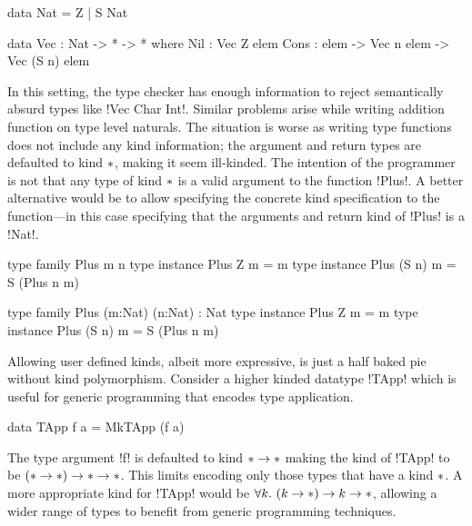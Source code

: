 \documentclass[manuscript,screen,nonacm]{acmart}
\begin{document}
\begin{minipage}[ht]{0.4\linewidth}
 \begin{code}
 data Nat = Z
 | S Nat
 \end{code}
\end{minipage}%
\begin{minipage}[ht]{0.4\linewidth}
\begin{code}
 data Vec : Nat -> * -> * where
 Nil : Vec Z elem
 Cons : elem -> Vec n elem -> Vec (S n) elem
\end{code}
\end{minipage}

In this setting, the type checker has enough information to reject semantically absurd types like !Vec Char Int!.
Similar problems arise while writing addition function on type level naturals. The situation is worse as writing type functions does not include any kind information; the argument and return types are defaulted to kind $\ast$, making it seem ill-kinded. The intention of the programmer is not that any type of kind $\ast$ is a valid argument to the function !Plus!. A better alternative would be to allow specifying the concrete kind specification to the function---in this case specifying that the arguments and return kind of !Plus! is a !Nat!.

\begin{minipage}[ht]{0.4\linewidth}
 \begin{code}
 type family Plus m n
 type instance Plus Z m = m
 type instance Plus (S n) m = S (Plus n m)
 \end{code}
\end{minipage}
\begin{minipage}[ht]{0.4\linewidth}
 \begin{code}
 type family Plus (m:Nat) (n:Nat) : Nat
 type instance Plus Z m = m
 type instance Plus (S n) m = S (Plus n m)
 \end{code}
\end{minipage}

Allowing user defined kinds, albeit more expressive, is just a half baked pie without kind polymorphism. Consider a higher kinded datatype !TApp! which is useful for generic programming that encodes type application.
\begin{code}
 data TApp f a = MkTApp (f a)
\end{code}

The type argument !f! is defaulted to kind $\ast \to \ast$ making the kind of !TApp! to be $(\ast \to \ast) \to \ast \to \ast$. This limits encoding only those types that have a kind $\ast$. A more appropriate kind for !TApp! would be $\forall k.~(k\to\ast) \to k \to \ast$, allowing a wider range of types to benefit from generic programming techniques.
\end{document}
